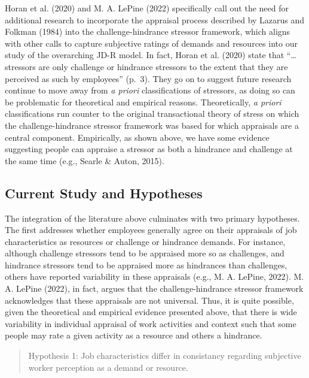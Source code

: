 \documentclass[
  english,
  man]{apa6}
\begin{document}
Horan et al. (2020) and M. A. LePine (2022) specifically call out the need for additional research to incorporate the appraisal process described by Lazarus and Folkman (1984) into the challenge-hindrance stressor framework, which aligns with other calls to capture subjective ratings of demands and resources into our study of the overarching JD-R model. In fact, Horan et al. (2020) state that ``\ldots stressors are only challenge or hindrance stressors to the extent that they are perceived as such by employees'' (p.~3). They go on to suggest future research continue to move away from \emph{a priori} classifications of stressors, as doing so can be problematic for theoretical and empirical reasons. Theoretically, \emph{a priori} classifications run counter to the original transactional theory of stress on which the challenge-hindrance stressor framework was based for which appraisals are a central component. Empirically, as shown above, we have some evidence suggesting people can appraise a stressor as both a hindrance and challenge at the same time (e.g., Searle \& Auton, 2015).

\hypertarget{current-study-and-hypotheses}{%
\subsection{Current Study and Hypotheses}\label{current-study-and-hypotheses}}

The integration of the literature above culminates with two primary hypotheses. The first addresses whether employees generally agree on their appraisals of job characteristics as resources or challenge or hindrance demands. For instance, although challenge stressors tend to be appraised more so as challenges, and hindrance stressors tend to be appraised more as hindrances than challenges, others have reported variability in these appraisals (e.g., M. A. LePine, 2022). M. A. LePine (2022), in fact, argues that the challenge-hindrance stressor framework acknowledges that these appraisals are not universal. Thus, it is quite possible, given the theoretical and empirical evidence presented above, that there is wide variability in individual appraisal of work activities and context such that some people may rate a given activity as a resource and others a hindrance.

\begin{quote}
Hypothesis 1: Job characteristics differ in consistancy regarding subjective worker perception as a demand or resource.
\end{quote}
\end{document}
